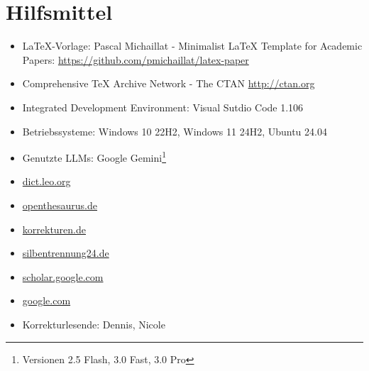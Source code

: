 \documentclass[letterpaper,11pt,leqno]{article}
\begin{document}
\section{Hilfsmittel}
\begin{itemize}
	\item LaTeX-Vorlage: Pascal Michaillat - Minimalist LaTeX Template for Academic Papers: \url{https://github.com/pmichaillat/latex-paper}
	\item Comprehensive TeX Archive Network - The CTAN \url{http://ctan.org}
	\item Integrated Development Environment: Visual Sutdio Code 1.106
	\item Betriebssysteme: Windows 10 22H2, Windows 11 24H2, Ubuntu 24.04
	\item Genutzte LLMs: Google Gemini\footnote{Versionen 2.5 Flash, 3.0 Fast, 3.0 Pro}
	\item \url{dict.leo.org}
	\item \url{openthesaurus.de}
	\item \url{korrekturen.de}
	\item \url{silbentrennung24.de}
	\item \url{scholar.google.com}
	\item \url{google.com}
	\item Korrekturlesende: Dennis, Nicole
\end{itemize}
\end{document}
